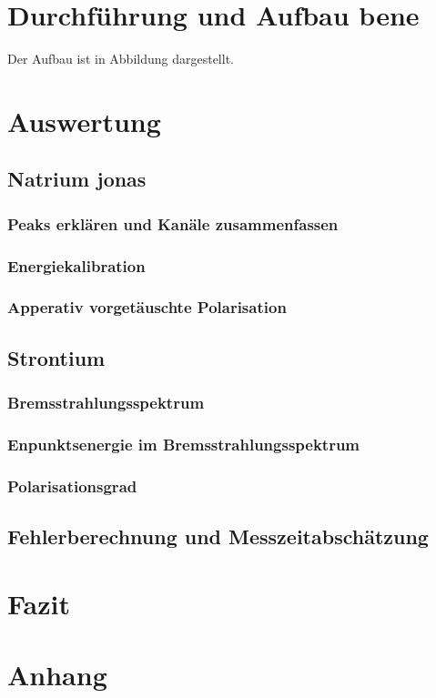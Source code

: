 \documentclass[twoside,colorback,accentcolor=tud4c,11pt]{tudreport}
\begin{document}
\chapter{Durchführung und Aufbau bene}
Der Aufbau ist in Abbildung    dargestellt. 
  
     	
\chapter{Auswertung}
\section{Natrium jonas}
\subsection{Peaks erklären und Kanäle zusammenfassen}
\subsection{Energiekalibration}
\subsection{Apperativ vorgetäuschte Polarisation}
\section{Strontium}
\subsection{Bremsstrahlungsspektrum}
\subsection{Enpunktsenergie im Bremsstrahlungsspektrum}
\subsection{Polarisationsgrad}
\section{Fehlerberechnung und Messzeitabschätzung}

\chapter{Fazit}


\chapter{Anhang}





		

\renewcommand{\bibname}{Literaturverzeichnis}
\begin{thebibliography}{Bak89}



\end{thebibliography} 	
\end{document}
